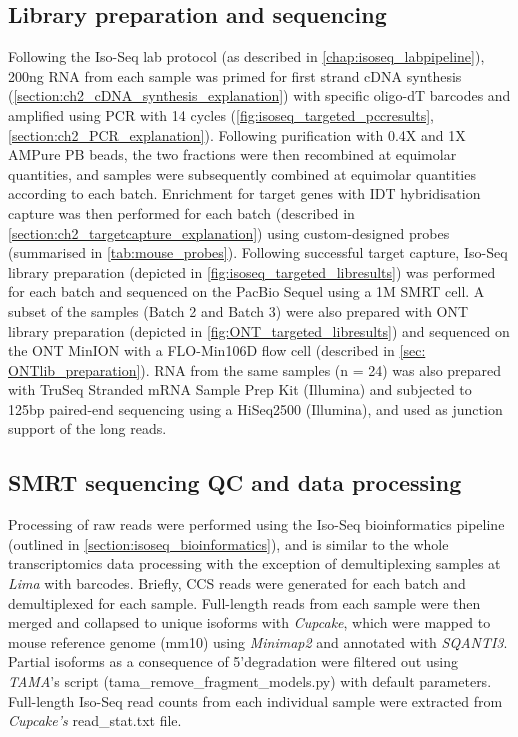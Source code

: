 \subsection{Library preparation and sequencing}
Following the Iso-Seq lab protocol (as described in \cref{chap:isoseq_labpipeline}), 200ng RNA from each sample was primed for first strand cDNA synthesis (\cref{section:ch2_cDNA_synthesis_explanation}) with specific oligo-dT barcodes and amplified using PCR with 14 cycles (\cref{fig:isoseq_targeted_pccresults}, \cref{section:ch2_PCR_explanation}). Following purification with 0.4X and 1X AMPure PB beads, the two fractions were then recombined at equimolar quantities, and samples were subsequently combined at equimolar quantities according to each batch. Enrichment for target genes with IDT hybridisation capture was then performed for each batch (described in \cref{section:ch2_targetcapture_explanation}) using custom-designed probes (summarised in \cref{tab:mouse_probes}). Following successful target capture, Iso-Seq library preparation (depicted in \cref{fig:isoseq_targeted_libresults}) was performed for each batch and sequenced on the PacBio Sequel using a 1M SMRT cell. A subset of the samples (Batch 2 and Batch 3) were also prepared with ONT library preparation (depicted in \cref{fig:ONT_targeted_libresults}) and sequenced on the ONT MinION with a FLO-Min106D flow cell (described in \cref{sec: ONTlib_preparation}). RNA from the same samples (n = 24) was also prepared with TruSeq Stranded mRNA Sample Prep Kit (Illumina) and subjected to 125bp paired-end sequencing using a HiSeq2500 (Illumina), and used as junction support of the long reads. 

\subsection{SMRT sequencing QC and data processing}
Processing of raw reads were performed using the Iso-Seq bioinformatics pipeline (outlined in \cref{section:isoseq_bioinformatics}), and is similar to the whole transcriptomics data processing with the exception of demultiplexing samples at \textit{Lima} with barcodes. Briefly, CCS reads were generated for each batch and demultiplexed for each sample. Full-length reads from each sample were then merged and collapsed to unique isoforms with \textit{Cupcake}, which were mapped to mouse reference genome (mm10) using \textit{Minimap2} and annotated with \textit{SQANTI3}. Partial isoforms as a consequence of 5'degradation were filtered out using \textit{TAMA}'s script (tama\_remove\_fragment\_models.py) with default parameters. Full-length Iso-Seq read counts from each individual sample were extracted from \textit{Cupcake's} read\_stat.txt file.

